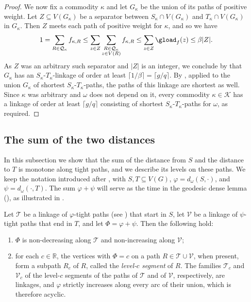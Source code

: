 \documentclass[fontsize=12pt,leading=14pt]{fullpaper}
\newcommand{\Kcal}{\mathcal{K}}
\newcommand{\Qcal}{\mathcal{Q}}
\newcommand{\Tcal}{\mathcal{T}}
\newcommand{\Vcal}{\mathcal{V}}
\begin{document}
\begin{proof}
  We now fix a commodity $\kappa$ and let $G_\kappa$ be the union of its paths of positive weight.
  Let $Z\subseteq V(G_\kappa)$ be a separator between $S_\kappa\cap V(G_\kappa)$ and $T_\kappa\cap V(G_\kappa)$ in $G_\kappa$.
  Then $Z$ meets each path of positive weight for $\kappa$, and so we have
  \[
    1=\sum_{R\in\Qcal_\kappa}f_{\kappa,R}
    \le\sum_{z\in Z}\sum_{\substack{R\in\Qcal_\kappa\\z\in V(R)}}f_{\kappa,R}
    \le\sum_{z\in Z}\gload_f(z)
    \le\beta|Z|.
  \]
  As $Z$ was an arbitrary such separator and $|Z|$ is an integer, we conclude by  that $G_\kappa$ has an $S_\kappa$-$T_\kappa$-linkage of order at least $\lceil1/\beta\rceil=\lceil g/q\rceil$.
  By , applied to the union $G_\kappa$ of shortest $S_\kappa$-$T_\kappa$-paths, the paths of this linkage are shortest as well.
  Since $\kappa$ was arbitrary and $\omega$ does not depend on it, every commodity $\kappa\in\Kcal$ has a linkage of order at least $\lceil g/q\rceil$ consisting of shortest $S_\kappa$-$T_\kappa$-paths for $\omega$, as required.
\end{proof}

\subsection{The sum of the two distances}\label{sec:geo-sum}

In this subsection we show that the sum of the distance from $S$ and the distance to $T$ is monotone along tight paths, and we describe its levels on these paths.
We keep the notation introduced after , with $S,T\subseteq V(G)$, $\varphi=d_\omega(S,\cdot)$, and $\psi=d_\omega(\cdot,T)$.
The sum $\varphi+\psi$ will serve as the time in the geodesic dense lemma (), as illustrated in .

\begin{lemma}\label{lem:monotone}
  Let $\Tcal$ be a linkage of $\varphi$-tight paths (see ) that start in $S$, let $\Vcal$ be a linkage of $\psi$-tight paths that end in $T$, and let $\Phi=\varphi+\psi$.
  Then the following hold:
  \begin{enumerate}[label=\textnormal{(\roman*)}]
    \item\label{item:geo-monotone} $\Phi$ is non-decreasing along $\Tcal$ and non-increasing along $\Vcal$;
    \item\label{item:geo-levels} for each $c\in\mathbb R$, the vertices with $\Phi=c$ on a path $R\in\Tcal\cup\Vcal$, when present, form a subpath $R_c$ of $R$, called the \emph{level-$c$ segment} of $R$.
      The families $\Tcal_c$ and $\Vcal_c$ of the level-$c$ segments of the paths of $\Tcal$ and of $\Vcal$, respectively, are linkages, and $\varphi$ strictly increases along every arc of their union, which is therefore acyclic.
  \end{enumerate}
\end{lemma}
\end{document}
